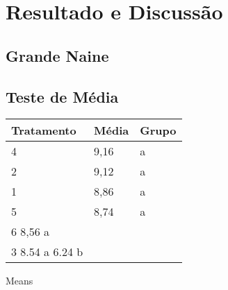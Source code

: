 \chapter{Resultado e Discussão}
\section{Grande Naine}

\section{Teste de Média}
  
 
 \begin{table}[htb]
 	\center
 	\footnotesize
 	\begin{tabular}{|p{1.4cm}|p{1cm}|p{3cm}}
 		\hline
 		\textbf{Tratamento} & \textbf{Média}  & \textbf{Grupo}\\
 		\hline
 		4 & 9,16 & a \\
 		\hline
 		2 & 9,12 & a \\
		\hline
 		1 & 8,86 & a \\
		\hline
 		5 & 8,74 & a \\
		\hline
 		6  8,56  a
		\hline
 		&& \\
		\hline
 		3  8.54  a
		\hline
		7  6.24     b
 	\end{tabular}
 \end{table}
  
  Means